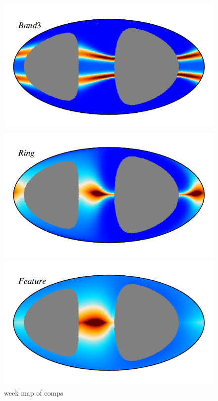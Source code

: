 \documentclass{aa}
\begin{document}
\begin{figure}
    \includegraphics[width=0.9\columnwidth]{figs/zodi_comps/zodi_06_a_band3.pdf}
    \vspace{-0.6cm}

    \includegraphics[width=0.9\columnwidth]{figs/zodi_comps/zodi_06_a_ring.pdf}
    \vspace{-0.6cm}

    \includegraphics[width=0.9\columnwidth]{figs/zodi_comps/zodi_06_a_feature.pdf}
    \caption{week map of comps}
    \label{fig: comp week}
  \end{figure}
\end{document}
